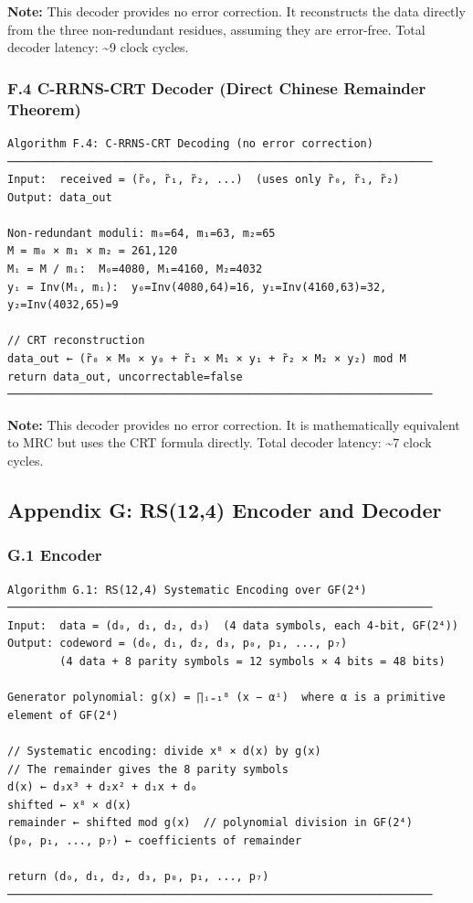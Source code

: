 \textbf{Note:} This decoder provides no error correction. It
reconstructs the data directly from the three non-redundant residues,
assuming they are error-free. Total decoder latency: \textasciitilde9
clock cycles.

\subsubsection{F.4 C-RRNS-CRT Decoder (Direct Chinese Remainder
Theorem)}\label{f.4-c-rrns-crt-decoder-direct-chinese-remainder-theorem}

\begin{verbatim}
Algorithm F.4: C-RRNS-CRT Decoding (no error correction)
─────────────────────────────────────────────────────────────────
Input:  received = (r̃₀, r̃₁, r̃₂, ...)  (uses only r̃₀, r̃₁, r̃₂)
Output: data_out

Non-redundant moduli: m₀=64, m₁=63, m₂=65
M = m₀ × m₁ × m₂ = 261,120
Mᵢ = M / mᵢ:  M₀=4080, M₁=4160, M₂=4032
yᵢ = Inv(Mᵢ, mᵢ):  y₀=Inv(4080,64)=16, y₁=Inv(4160,63)=32, y₂=Inv(4032,65)=9

// CRT reconstruction
data_out ← (r̃₀ × M₀ × y₀ + r̃₁ × M₁ × y₁ + r̃₂ × M₂ × y₂) mod M
return data_out, uncorrectable=false
─────────────────────────────────────────────────────────────────
\end{verbatim}

\textbf{Note:} This decoder provides no error correction. It is
mathematically equivalent to MRC but uses the CRT formula directly.
Total decoder latency: \textasciitilde7 clock cycles.

\subsection{Appendix G: RS(12,4) Encoder and
Decoder}\label{appendix-g-rs124-encoder-and-decoder}

\subsubsection{G.1 Encoder}\label{g.1-encoder}

\begin{verbatim}
Algorithm G.1: RS(12,4) Systematic Encoding over GF(2⁴)
─────────────────────────────────────────────────────────────────
Input:  data = (d₀, d₁, d₂, d₃)  (4 data symbols, each 4-bit, GF(2⁴))
Output: codeword = (d₀, d₁, d₂, d₃, p₀, p₁, ..., p₇)
        (4 data + 8 parity symbols = 12 symbols × 4 bits = 48 bits)

Generator polynomial: g(x) = ∏ᵢ₌₁⁸ (x − αⁱ)  where α is a primitive element of GF(2⁴)

// Systematic encoding: divide x⁸ × d(x) by g(x)
// The remainder gives the 8 parity symbols
d(x) ← d₃x³ + d₂x² + d₁x + d₀
shifted ← x⁸ × d(x)
remainder ← shifted mod g(x)  // polynomial division in GF(2⁴)
(p₀, p₁, ..., p₇) ← coefficients of remainder

return (d₀, d₁, d₂, d₃, p₀, p₁, ..., p₇)
─────────────────────────────────────────────────────────────────
\end{verbatim}

